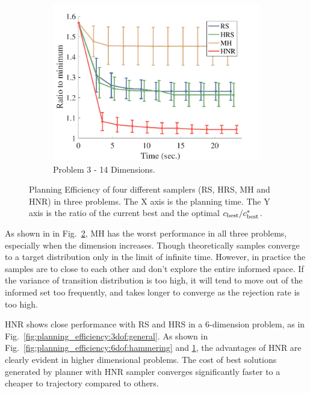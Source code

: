 \documentclass[letterpaper, 10 pt, conference]{ieeeconf}  %
\begin{document}
\begin{figure}[t!]
\begin{subfigure}[b]{0.325\textwidth}
	\includegraphics[width=\linewidth]{fig/planning_efficiency/herb_batting_efficiency}
	\caption{\captionstyle Problem 3 - 14 Dimensions.}
	\label{fig:planning_efficiency:herb:batting}
    \end{subfigure}
	\caption{\captionstyle Planning Efficiency of four different samplers (RS, HRS, MH and HNR) in three problems. 
	The X axis is the planning time. 
	The Y axis is the ratio of the current best and the optimal $ c_{\rm best} / c^*_{\rm best} $.}
	\label{fig:planning_efficiency}
\end{figure} 


As shown in in Fig.~\ref{fig:planning_efficiency}, MH has the worst performance in all three problems, especially when the dimension increases.
Though theoretically samples converge to a target distribution only in the limit of infinite time. However, in practice the samples are to close to each other and don't explore the entire informed space.
If the variance of transition distribution is too high, it will tend to move out of the informed set too frequently, and takes longer to converge as the rejection rate is too high.

HNR shows close performance with RS and HRS in a 6-dimension problem, as in Fig.~\ref{fig:planning_efficiency:3dof:general}. 
As shown in Fig.~\ref{fig:planning_efficiency:6dof:hammering} and \ref{fig:planning_efficiency:herb:batting}, the advantages of HNR are clearly evident in higher dimensional problems. The cost of best solutions generated by planner with HNR sampler converges significantly faster to a cheaper to trajectory compared to others.
\end{document}
